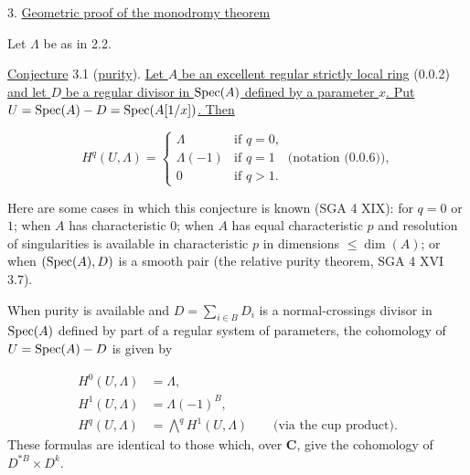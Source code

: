 
3. \underline{Geometric proof of the monodromy theorem}

Let $\Lambda$ be as in 2.2.

\underline{Conjecture} 3.1 (\underline{purity}). \underline{Let $A$ be an
excellent regular strictly local ring} (0.0.2) \underline{and let $D$ be a
regular divisor in $\operatorname{Spec}(A)$ defined by a parameter $x$. Put
$U=\operatorname{Spec}(A)-D=\operatorname{Spec}(A[1/x])$. Then}

\begin{equation}\tag{3.1.1}
H^{q}(U,\Lambda)=
\begin{cases}
\Lambda & \text{if }q=0,\\[4pt]
\Lambda(-1) & \text{if }q=1\quad\text{(notation (0.0.6)),}\\[4pt]
0 & \text{if }q>1.
\end{cases}
\end{equation}

Here are some cases in which this conjecture is known (SGA 4 XIX): for
$q=0$ or $1$; when $A$ has characteristic $0$; when $A$ has equal
characteristic $p$ and resolution of singularities is available in
characteristic $p$ in dimensions $\leqslant\dim(A)$; or when
$(\operatorname{Spec}(A),D)$ is a smooth pair (the relative purity theorem, SGA 4 XVI
3.7).

When purity is available and
$D=\sum_{i\in B}D_i$ is a normal-crossings divisor in $\operatorname{Spec}(A)$ defined
by part of a regular system of parameters, the cohomology of
$U=\operatorname{Spec}(A)-D$ is given by


\begin{equation}\tag{3.1.2}
\begin{aligned}
H^0(U,\Lambda)&=\Lambda,\\[4pt]
H^1(U,\Lambda)&=\Lambda(-1)^B,\\[4pt]
H^q(U,\Lambda)&=\bigwedge\nolimits^q H^1(U,\Lambda)
  \qquad\text{(via the cup product).}
\end{aligned}
\end{equation}
These formulas are identical to those which, over $\mathbf C$, give the
cohomology of $D^{*B}\times D^k$.

